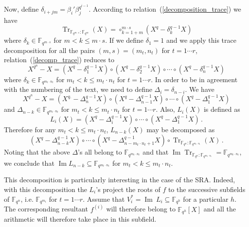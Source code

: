 \documentclass{sig-alternate}
\newcommand{\ff}[1]{\mathbb{F}_{#1}}
\newcommand{\qq}{q}
\newcommand{\nn}{n}
\newcommand{\qn}{{\qq^\nn}}
\newcommand{\extf}{\ff{\qn}}
\DeclareMathOperator{\Tr}{Tr}
\DeclareMathOperator{\Ima}{Im}
\newcommand{\tr}[2]{\Tr_{\ff{#1}:\ff{#2}}}
\begin{document}
Now, define $\delta_{i+jm}=\beta_i' \beta_j^{\qq^{i-1}} $. According to relation~(\ref{decomposition_trace}) we have
$$\tr{\qq^{m \cdot s}}{\qq^{m}}(X)=\circ_{k=1+m}^{m \cdot s}  (X^{\qq} -\delta_k^{\qq-1} X )$$
where $\delta_{k} \in \mathbb{F}_{\qq^{m \cdot s}}$ for $m  < k \le m \cdot s$. If we define $\delta_1=1$ and we apply this trace decomposition for all the pairs $(m,s)=(m_{t},n_t)$ for $t=1 \cdots r$, 
relation~(\ref{decomp_trace}) reduces to  
$$X^{\qq^{\nn}}-X=(X^{\qq} -\delta_1^{\qq-1} X ) \circ (X^{\qq} -\delta_2^{\qq-1} X ) \circ \cdots \circ (X^{\qq} -\delta_n^{\qq-1} X )$$
where $\delta_{k} \in \mathbb{F}_{\qq^{m_t \cdot n_t}}$ for $m_{t}  < k \le m_t \cdot n_t$ for $t=1 \cdots r$. In order to be in agreement with the numbering of the text, we need to define $\Delta_i=\delta_{n-i}$.
We have
$$X^{\qq^{\nn}}-X=(X^{\qq.} -\Delta_n^{\qq-1} X ) \circ (X^{\qq} -\Delta_{n-1}^{\qq-1} X ) \circ \cdots \circ (X^{\qq} -\Delta_1^{\qq-1} X )$$
and $\Delta_{n-k} \in \mathbb{F}_{\qq^{m_t \cdot n_t}}$ for $m_{t}  < k \le m_t \cdot n_t$ for $t=1 \cdots r$.
Also, $L_i(X)$ is defined as 
$$L_i(X)= (X^q-\Delta_i^{q-1} X) \circ \cdots \circ (X^q-\Delta_1^{q-1} X)\,.$$
Therefore for any $m_{t} < k \le  m_t \cdot n_t$, $L_{n-k}(X)$ may be decomposed as
$$(X^q-\Delta_{n-k}^{q-1}X) \circ \cdots \circ (X^q-\Delta_{n-m_t \cdot n_t+1}^{q-1}X) \circ  \tr{\qq^{n}}{\qq^{m_t \cdot n_t}}(X)\,.$$
Noting that the above $\Delta$'s all belong to $\mathbb{F}_{\qq^{m_t \cdot n_t}}$ and that $\Ima \tr{\qq^{n}}{\qq^{m_t \cdot n_t}}=\mathbb{F}_{\qq^{m_t \cdot n_t}}$, we conclude that $\Ima L_{n-k} \subseteq \mathbb{F}_{\qq^{m_t \cdot n_t}}$ for $ m_{t}  < k \le m_{t} \cdot n_t$.

\medskip

 This decomposition is particularly interesting in the case of the SRA. Indeed, with this decomposition the $L_i$'s project the roots of $f$ to the successive subfields of $\extf$, i.e.  $\mathbb{F}_{\qq^{m_t}}$ for $t=1 \cdots r$.
 Assume that $V_i^\ast=\Ima~L_i \subseteq \mathbb{F}_{\qq^h}$ for a particular $h$. The corresponding resultant $f^{(i)}$ will therefore belong to $\mathbb{F}_{\qq^h}[X]$ and all the arithmetic will therefore take place in this subfield.
  

\end{document}
